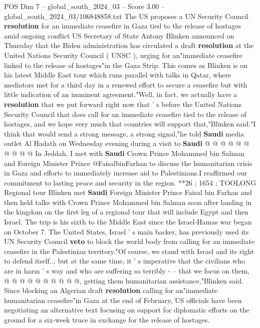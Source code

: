 \begin{textsample}{POS Dim 7 – global\_south\_2024\_03 – Score 3.00 – global\_south\_2024\_03/106848858.txt}  \label{ex:f7_pos_021}
The US proposes a UN Security Council \textbf{resolution} for an immediate ceasefire in Gaza tied to the release of hostages amid ongoing conflict US Secretary of State Antony Blinken announced on Thursday that the Biden administration has circulated a draft \textbf{resolution} at the United Nations Security Council ( UNSC ), urging for an"immediate ceasefire linked to the release of hostages"in the Gaza Strip.
This comes as Blinken is on his latest Middle East tour which runs parallel with talks in Qatar, where mediators met for a third day in a renewed effort to secure a ceasefire but with little indication of an imminent agreement."Well, in fact, we actually have a \textbf{resolution} that we put forward right now that ' s before the United Nations Security Council that does call for an immediate ceasefire tied to the release of hostages, and we hope very much that countries will support that,"Blinken said."I think that would send a strong message, a strong signal,"he told \textbf{Saudi} media outlet Al Hadath on Wednesday evening during a visit to \textbf{Saudi} @ @ @ @ @ @ @ @ @ @ In Jeddah, I met with \textbf{Saudi} Crown Prince Mohammed bin Salman and Foreign Minister Prince @FaisalbinFarhan to discuss the humanitarian crisis in Gaza and efforts to immediately increase aid to Palestinians.I reaffirmed our commitment to lasting peace and security in the region. **26 ; 1654 ; TOOLONG Regional tour Blinken met \textbf{Saudi} Foreign Minister Prince Faisal bin Farhan and then held talks with Crown Prince Mohammed bin Salman soon after landing in the kingdom on the first leg of a regional tour that will include Egypt and then Israel.
The trip is his sixth to the Middle East since the Israel-Hamas war began on October 7.
The United States, Israel ' s main backer, has previously used its UN Security Council \textbf{veto} to block the world body from calling for an immediate ceasefire in the Palestinian territory."Of course, we stand with Israel and its right to defend itself... but at the same time, it ' s imperative that the civilians who are in harm ' s way and who are suffering so terribly - -- that we focus on them, @ @ @ @ @ @ @ @ @ @, getting them humanitarian assistance,"Blinken said.
Since blocking an Algerian draft \textbf{resolution} calling for an"immediate humanitarian ceasefire"in Gaza at the end of February, US officials have been negotiating an alternative text focusing on support for diplomatic efforts on the ground for a six-week truce in exchange for the release of hostages.

\end{textsample}
